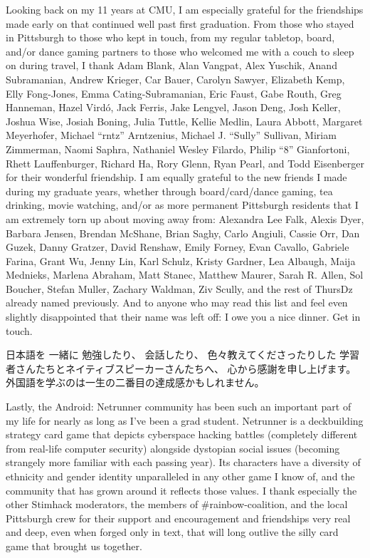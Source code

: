 \documentclass[12pt]{cmuthesis}
\begin{document}
\begin{acknowledgments}
{Looking back on my 11 years at CMU,
I am especially grateful for the friendships made early on %
that continued well past first graduation.
From those who stayed in Pittsburgh %
to those who %
kept in touch,
from my regular tabletop, board, and/or dance gaming partners
to those who %
welcomed me with %
a couch to sleep on during travel,
I thank
Adam Blank,
Alan Vangpat,
Alex Yuschik,
Anand Subramanian,
Andrew Krieger,
Car Bauer,
Carolyn Sawyer,
Elizabeth Kemp,
Elly Fong-Jones,
Emma Cating-Subramanian,
Eric Faust,
Gabe Routh,
Greg Hanneman,
Hazel Vird\'{o},
Jack Ferris,
Jake Lengyel,
Jason Deng,
Josh Keller,
Joshua Wise,
Josiah Boning,
Julia Tuttle,
Kellie Medlin,
Laura Abbott,
Margaret Meyerhofer,
Michael ``rntz'' Arntzenius,
Michael J. ``Sully'' Sullivan,
Miriam Zimmerman,
Naomi Saphra,
Nathaniel Wesley Filardo,
Philip ``8'' Gianfortoni,
Rhett Lauffenburger,
Richard Ha,
Rory Glenn,
Ryan Pearl,
and
Todd Eisenberger
for their wonderful friendship.
I am equally grateful to the new friends I made during my graduate years,
whether through board/card/dance gaming, tea drinking, %
movie watching,
and/or as more permanent Pittsburgh residents that I am extremely torn up about moving away from:
Alexandra Lee Falk,
Alexis Dyer,
Barbara Jensen,
Brendan McShane,
Brian Saghy,
Carlo Angiuli,
Cassie Orr,
Dan Guzek,
Danny Gratzer,
David Renshaw,
Emily Forney,
Evan Cavallo,
Gabriele Farina,
Grant Wu,
Jenny Lin,
Karl Schulz,
Kristy Gardner,
Lea Albaugh,
Maija Mednieks,
Marlena Abraham,
Matt Stanec,
Matthew Maurer,
Sarah R. Allen,
Sol Boucher,
Stefan Muller,
Zachary Waldman,
Ziv Scully,
and the rest of ThursDz already named previously.
And to anyone who may read this list
and feel even slightly disappointed that their name was left off:
I owe you a nice dinner. Get in touch.

日本語を
一緒に
勉強したり、
会話したり、
色々教えてくださったりした
学習者さんたちとネイティブスピーカーさんたちへ、
心から感謝を申し上げます。
外国語を学ぶのは一生の二番目の達成感かもしれません。

Lastly,
the Android: Netrunner community has been such an important part of my life
for nearly as long as I've been a grad student.
Netrunner is a deckbuilding strategy card game
that depicts cyberspace hacking battles (completely different from real-life computer security)
alongside dystopian social issues (becoming strangely more familiar with each passing year).
Its characters have a diversity of ethnicity and gender identity %
unparalleled in any other game I know of,
and the community that has grown around it reflects those values.
I thank especially the other Stimhack moderators,
the members of {\sf \#rainbow-coalition},
and the local Pittsburgh crew
for their support and encouragement and
friendships very real and deep, even when forged only in text,
that will long outlive the silly card game that brought us together.
}


\end{acknowledgments}
\end{document}
